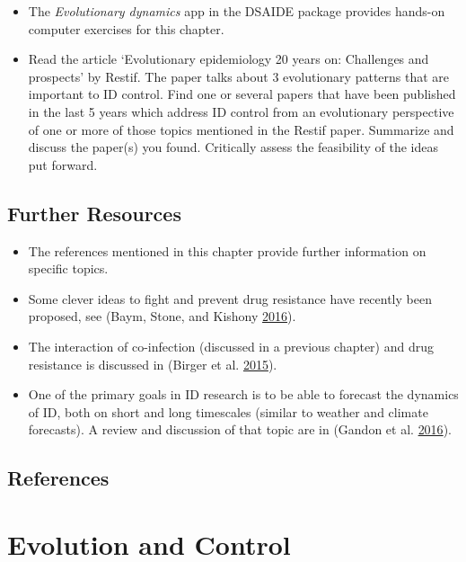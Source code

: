 \documentclass[]{book}
\providecommand{\tightlist}{%
  \setlength{\itemsep}{0pt}\setlength{\parskip}{0pt}}
\theoremstyle{definition}
\theoremstyle{definition}
\theoremstyle{definition}
\theoremstyle{remark}
\begin{document}
\begin{itemize}
\tightlist
\item
  The \emph{Evolutionary dynamics} app in the DSAIDE package provides
  hands-on computer exercises for this chapter.
\item
  Read the article `Evolutionary epidemiology 20 years on: Challenges
  and prospects' by Restif. The paper talks about 3 evolutionary
  patterns that are important to ID control. Find one or several papers
  that have been published in the last 5 years which address ID control
  from an evolutionary perspective of one or more of those topics
  mentioned in the Restif paper. Summarize and discuss the paper(s) you
  found. Critically assess the feasibility of the ideas put forward.
\end{itemize}

\section{Further Resources}\label{further-resources-13}

\begin{itemize}
\tightlist
\item
  The references mentioned in this chapter provide further information
  on specific topics.
\item
  Some clever ideas to fight and prevent drug resistance have recently
  been proposed, see (Baym, Stone, and Kishony
  \protect\hyperlink{ref-baym16}{2016}).
\item
  The interaction of co-infection (discussed in a previous chapter) and
  drug resistance is discussed in (Birger et al.
  \protect\hyperlink{ref-birger15}{2015}).
\item
  One of the primary goals in ID research is to be able to forecast the
  dynamics of ID, both on short and long timescales (similar to weather
  and climate forecasts). A review and discussion of that topic are in
  (Gandon et al. \protect\hyperlink{ref-gandon16}{2016}).
\end{itemize}

\section{References}\label{references-14}

\chapter{Evolution and Control}\label{evolution-and-control}
\end{document}
